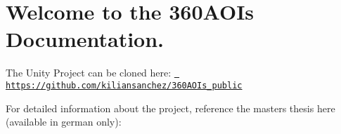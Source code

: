 \chapter{Welcome to the 360AOIs Documentation.}
\hypertarget{index}{}\label{index}
\label{index_md_mainpage}%
%
 The Unity Project can be cloned here\+: \href{https://github.com/kiliansanchez/360AOIs_public}{\texttt{ https\+://github.\+com/kiliansanchez/360\+AOIs\+\_\+public}}

For detailed information about the project, reference the master\textquotesingle{}s thesis here (available in german only)\+: 